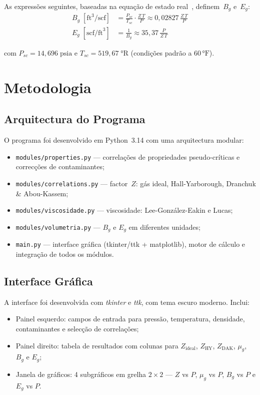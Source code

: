 \documentclass[12pt,a4paper]{article}
\begin{document}
As expressões seguintes, baseadas na equação de estado real~\cite{Ramos2020}, definem~$B_g$ e~$E_g$:
\begin{align}
  B_g \;[\text{ft}^3/\text{scf}] &= \frac{P_{sc}}{T_{sc}}\cdot\frac{Z\,T}{P}
  \approx 0{,}02827\,\frac{Z\,T}{P}
  \label{eq:Bg}\\[4pt]
  E_g \;[\text{scf/ft}^3] &= \frac{1}{B_g} \approx 35{,}37\,\frac{P}{Z\,T}
  \label{eq:Eg}
\end{align}

\noindent com $P_{sc}=14{,}696\;\text{psia}$ e $T_{sc}=519{,}67\;°\text{R}$
(condições padrão a $60\,°\text{F}$).

\section{Metodologia}

\subsection{Arquitectura do Programa}

O programa foi desenvolvido em Python~3.14 com uma arquitectura modular:

\begin{itemize}[noitemsep]
  \item \texttt{modules/properties.py} — correlações de propriedades pseudo-críticas
    e correcções de contaminantes;
  \item \texttt{modules/correlations.py} — factor~$Z$: gás ideal, Hall-Yarborough,
    Dranchuk \& Abou-Kassem;
  \item \texttt{modules/viscosidade.py} — viscosidade: Lee-González-Eakin e Lucas;
  \item \texttt{modules/volumetria.py} — $B_g$ e $E_g$ em diferentes unidades;
  \item \texttt{main.py} — interface gráfica (tkinter/ttk + matplotlib), motor
    de cálculo e integração de todos os módulos.
\end{itemize}

\subsection{Interface Gráfica}

A interface foi desenvolvida com \textit{tkinter} e \textit{ttk}, com tema escuro
moderno. Inclui:
\begin{itemize}[noitemsep]
  \item Painel esquerdo: campos de entrada para pressão, temperatura, densidade,
    contaminantes e selecção de correlações;
  \item Painel direito: tabela de resultados com colunas para $Z_{\text{ideal}}$,
    $Z_{\text{HY}}$, $Z_{\text{DAK}}$, $\mu_g$, $B_g$ e $E_g$;
  \item Janela de gráficos: 4 subgráficos em grelha $2\times2$ — $Z$ vs $P$,
    $\mu_g$ vs $P$, $B_g$ vs $P$ e $E_g$ vs $P$.
\end{itemize}
\end{document}
